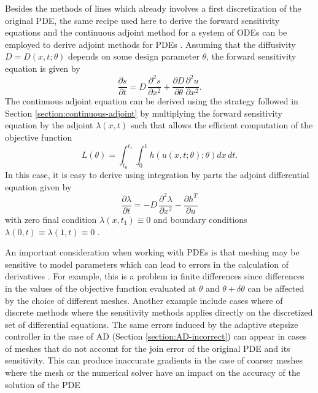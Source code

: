 Besides the methods of lines which already involves a first discretization of the original PDE, the same recipe used here to derive the forward sensitivity equations and the continuous adjoint method for a system of ODEs can be employed to derive adjoint methods for PDEs \cite{Giles_Pierce_2000}. 
Assuming that the diffusivity $D = D(x, t; \theta)$ depends on some design parameter $\theta$, the forward sensitivity equation is given by 
\begin{equation}
 \frac{\partial s}{\partial t}
 = 
 D \, 
 \frac{\partial^2 s}{\partial x^2}
 + 
 \frac{\partial D}{\partial \theta} \frac{\partial^2 u}{\partial x^2}. 
\end{equation}
The continuous adjoint equation can be derived using the strategy followed in Section \ref{section:continuous-adjoint} by multiplying the forward sensitivity equation by the adjoint $\lambda (x,t)$ such that allows the efficient computation of the objective function
\begin{equation}
    L(\theta) = \int_{t_0}^{t_1} \int_0^1 h(u(x,t;\theta); \theta) dx \, dt. 
\end{equation}
In this case, it is easy to derive using integration by parts the adjoint differential equation given by 
\begin{equation}
    \frac{\partial \lambda}{\partial t}
    = 
    - 
    D \, \frac{\partial^2 \lambda}{\partial x^2}
    - 
    \frac{\partial h^T}{\partial u}
\end{equation}
with zero final condition $\lambda(x, t_1) \equiv 0$ and boundary conditions $\lambda(0, t) \equiv \lambda(1, t) \equiv 0$ \cite{duchateau1996introduction}.

An important consideration when working with PDEs is that meshing may be sensitive to model parameters which can lead to errors in the calculation of derivatives \cite{nadarajah2000comparison}. 
For example, this is a problem in finite differences since differences in the values of the objective function evaluated at $\theta$ and $\theta + \delta \theta$ can be affected by the choice of different meshes. 
Another example include cases where of discrete methods where the sensitivity methods applies directly on the discretized set of differential equations. 
The same errors induced by the adaptive stepsize controller in the case of AD (Section \ref{section:AD-incorrect}) can appear in cases of meshes that do not account for the join error of the original PDE and its sensitivity. 
This can produce inaccurate gradients in the case of coarser meshes where the mesh or the numerical solver have an impact on the accuracy of the solution of the PDE \cite{economon2017adjoint, KENWAY2019100542}

